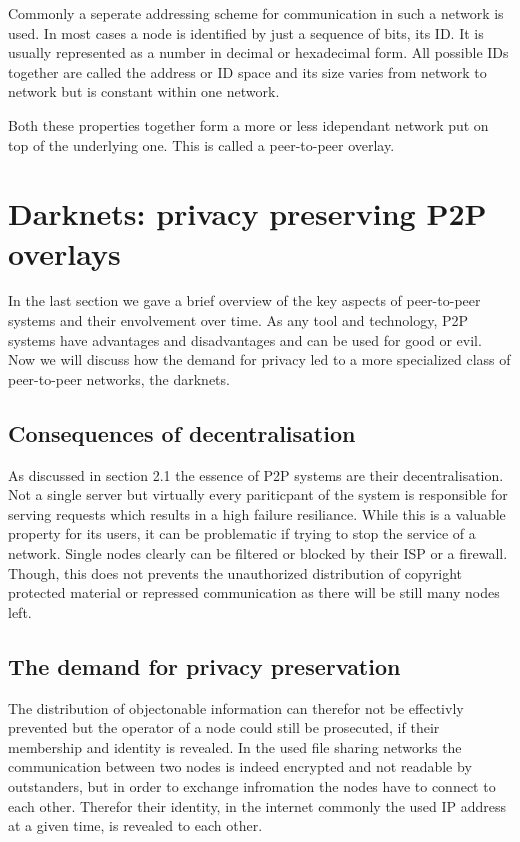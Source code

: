 Commonly a seperate addressing scheme for communication in such a network is used. In most cases a node is identified by just a sequence of bits, its ID. It is usually represented as a number in decimal or hexadecimal form. All possible IDs together are called the address or ID space and its size varies from network to network but is constant within one network.

Both these properties together form a more or less idependant network put on top of the underlying one. This is called a peer-to-peer overlay.


\section{Darknets: privacy preserving P2P overlays}

In the last section we gave a brief overview of the key aspects of peer-to-peer systems and their envolvement over time. As any tool and technology, P2P systems have advantages and disadvantages and can be used for good or evil. Now we will discuss how the demand for privacy led to a more specialized class of peer-to-peer networks, the darknets.

\subsection{Consequences of decentralisation}

As discussed in section 2.1 the essence of P2P systems are their decentralisation. Not a single server but virtually every pariticpant of the system is responsible for serving requests which results in a high failure resiliance. While this is a valuable property for its users, it can be problematic if trying to stop the service of a network. Single nodes clearly can be filtered or blocked by their ISP or a firewall. Though, this does not prevents the unauthorized distribution of copyright protected material or repressed communication as there will be still many nodes left.

\subsection{The demand for privacy preservation}

The distribution of objectonable information can therefor not be effectivly prevented but the operator of a node could still be prosecuted, if their membership and identity is revealed. In the used file sharing networks the communication between two nodes is indeed encrypted and not readable by outstanders, but in order to exchange infromation the nodes have to connect to each other. Therefor their identity, in the internet commonly the used IP address at a given time, is revealed to each other.

